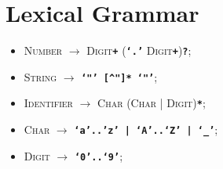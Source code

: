 \documentclass{article}
\begin{document}
\pagebreak



\section*{Lexical Grammar}


\begin{itemize}

    \item \textsc{Number}         $\rightarrow$ \textsc{Digit}\textbf{\texttt{+}} (\textbf{\texttt{`.'}} \textsc{Digit}\textbf{\texttt{+}})\textbf{\texttt{?}};
    \item \textsc{String}         $\rightarrow$ \texttt{\textbf{`"' [\^{}"]* `"'}};
    \item \textsc{Identifier}     $\rightarrow$ \textsc{Char} (\textsc{Char} | \textsc{Digit})\texttt{\textbf{*}};
    \item \textsc{Char}           $\rightarrow$ \texttt{\textbf{`a'..'z' | `A'..`Z' | `\_{}'}};
    \item \textsc{Digit}          $\rightarrow$ \texttt{\textbf{`0'..`9'}};

\end{itemize}
\end{document}
